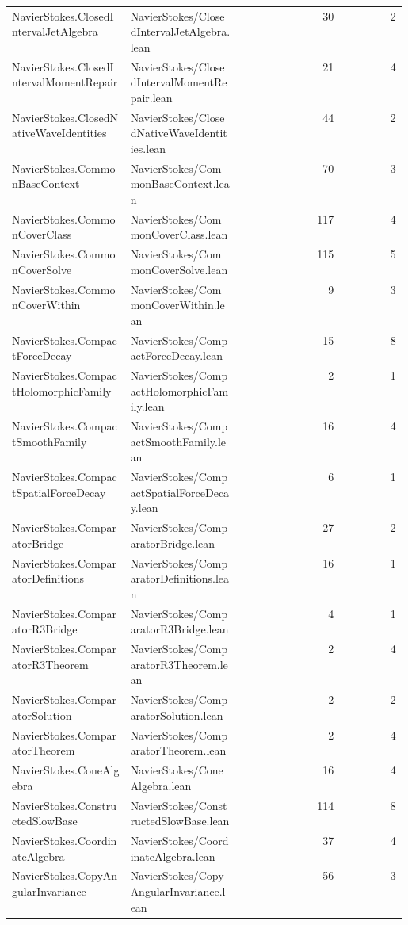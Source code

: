 \begin{longtable}{p{0.30\linewidth}p{0.28\linewidth}rr}
NavierStokes.ClosedIntervalJetAlgebra & NavierStokes/ClosedIntervalJetAlgebra.lean & 30 & 2\\
NavierStokes.ClosedIntervalMomentRepair & NavierStokes/ClosedIntervalMomentRepair.lean & 21 & 4\\
NavierStokes.ClosedNativeWaveIdentities & NavierStokes/ClosedNativeWaveIdentities.lean & 44 & 2\\
NavierStokes.CommonBaseContext & NavierStokes/CommonBaseContext.lean & 70 & 3\\
NavierStokes.CommonCoverClass & NavierStokes/CommonCoverClass.lean & 117 & 4\\
NavierStokes.CommonCoverSolve & NavierStokes/CommonCoverSolve.lean & 115 & 5\\
NavierStokes.CommonCoverWithin & NavierStokes/CommonCoverWithin.lean & 9 & 3\\
NavierStokes.CompactForceDecay & NavierStokes/CompactForceDecay.lean & 15 & 8\\
NavierStokes.CompactHolomorphicFamily & NavierStokes/CompactHolomorphicFamily.lean & 2 & 1\\
NavierStokes.CompactSmoothFamily & NavierStokes/CompactSmoothFamily.lean & 16 & 4\\
NavierStokes.CompactSpatialForceDecay & NavierStokes/CompactSpatialForceDecay.lean & 6 & 1\\
NavierStokes.ComparatorBridge & NavierStokes/ComparatorBridge.lean & 27 & 2\\
NavierStokes.ComparatorDefinitions & NavierStokes/ComparatorDefinitions.lean & 16 & 1\\
NavierStokes.ComparatorR3Bridge & NavierStokes/ComparatorR3Bridge.lean & 4 & 1\\
NavierStokes.ComparatorR3Theorem & NavierStokes/ComparatorR3Theorem.lean & 2 & 4\\
NavierStokes.ComparatorSolution & NavierStokes/ComparatorSolution.lean & 2 & 2\\
NavierStokes.ComparatorTheorem & NavierStokes/ComparatorTheorem.lean & 2 & 4\\
NavierStokes.ConeAlgebra & NavierStokes/ConeAlgebra.lean & 16 & 4\\
NavierStokes.ConstructedSlowBase & NavierStokes/ConstructedSlowBase.lean & 114 & 8\\
NavierStokes.CoordinateAlgebra & NavierStokes/CoordinateAlgebra.lean & 37 & 4\\
NavierStokes.CopyAngularInvariance & NavierStokes/CopyAngularInvariance.lean & 56 & 3\\

\end{longtable}
